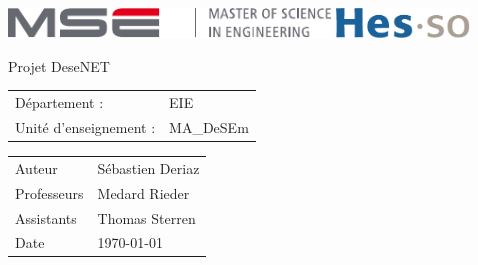 \documentclass[]{article}
\begin{document}
\thispagestyle{empty}

\begin{center}
\includegraphics[height=8mm]{mse-full-cropped.pdf}
\hfill
\includegraphics[height=8mm]{HES-SO_logo_Pantone.pdf}
\end{center}
\vfill
\begin{center}
\Huge Projet DeseNET\\
\end{center}
\begin{center}
\large
\begin{tabular}{ll}
Département : & EIE\\
Unité d'enseignement : & MA\_DeSEm
\end{tabular}
\end{center}
\vfill
\begin{center}
\large
\begin{tabular}{ll}
\Large Auteur & \Large Sébastien Deriaz\\
Professeurs & Medard Rieder\\ 
Assistants & Thomas Sterren\\
Date & \today
\end{tabular}
\end{center}
\vfill

\pagebreak
\tableofcontents
\pagebreak


\pagebreak


\pagebreak

\pagebreak

\end{document}
